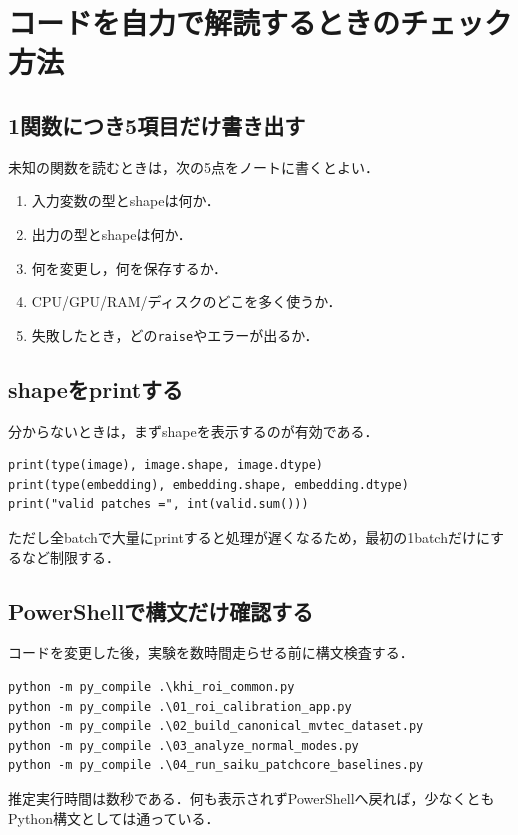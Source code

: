 \documentclass[a4paper,11pt]{ltjsreport}
\begin{document}
\chapter{コードを自力で解読するときのチェック方法}

\section{1関数につき5項目だけ書き出す}
未知の関数を読むときは，次の5点をノートに書くとよい．

\begin{enumerate}
\item 入力変数の型とshapeは何か．
\item 出力の型とshapeは何か．
\item 何を変更し，何を保存するか．
\item CPU/GPU/RAM/ディスクのどこを多く使うか．
\item 失敗したとき，どの\texttt{raise}やエラーが出るか．
\end{enumerate}

\section{shapeをprintする}
分からないときは，まずshapeを表示するのが有効である．

\begin{lstlisting}
print(type(image), image.shape, image.dtype)
print(type(embedding), embedding.shape, embedding.dtype)
print("valid patches =", int(valid.sum()))
\end{lstlisting}

ただし全batchで大量にprintすると処理が遅くなるため，最初の1batchだけにするなど制限する．

\section{PowerShellで構文だけ確認する}
コードを変更した後，実験を数時間走らせる前に構文検査する．

\begin{verbatim}
python -m py_compile .\khi_roi_common.py
python -m py_compile .\01_roi_calibration_app.py
python -m py_compile .\02_build_canonical_mvtec_dataset.py
python -m py_compile .\03_analyze_normal_modes.py
python -m py_compile .\04_run_saiku_patchcore_baselines.py
\end{verbatim}

推定実行時間は数秒である．何も表示されずPowerShellへ戻れば，少なくともPython構文としては通っている．
\end{document}

